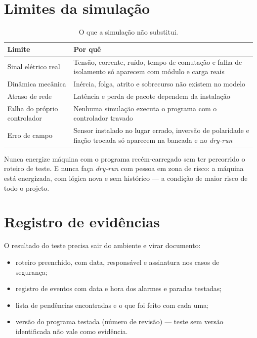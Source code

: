 \section{Limites da simulação}

\begin{table}[H]
  \centering
  \caption{O que a simulação não substitui.}
  \label{tab:limites-simulacao}
  \begin{tabular}{p{5.6cm} p{9.0cm}}
    \toprule
    Limite & Por quê \\
    \midrule
    Sinal elétrico real & Tensão, corrente, ruído, tempo de comutação e falha de isolamento só
      aparecem com módulo e carga reais \\
    Dinâmica mecânica & Inércia, folga, atrito e sobrecurso não existem no modelo \\
    Atraso de rede & Latência e perda de pacote dependem da instalação \\
    Falha do próprio controlador & Nenhuma simulação executa o programa com o controlador travado \\
    Erro de campo & Sensor instalado no lugar errado, inversão de polaridade e fiação trocada só
      aparecem na bancada e no \emph{dry-run} \\
    \bottomrule
  \end{tabular}
\end{table}

\begin{atencao}
Nunca energize máquina com o programa recém-carregado sem ter percorrido o roteiro de teste. E nunca
faça \emph{dry-run} com pessoa em zona de risco: a máquina está energizada, com lógica nova e sem
histórico --- a condição de maior risco de todo o projeto.
\end{atencao}

\section{Registro de evidências}

O resultado do teste precisa sair do ambiente e virar documento:

\begin{itemize}
  \item roteiro preenchido, com data, responsável e assinatura nos casos de segurança;
  \item registro de eventos com data e hora dos alarmes e paradas testadas;
  \item lista de pendências encontradas e o que foi feito com cada uma;
  \item versão do programa testada (número de revisão) --- teste sem versão identificada não vale
        como evidência.
\end{itemize}

